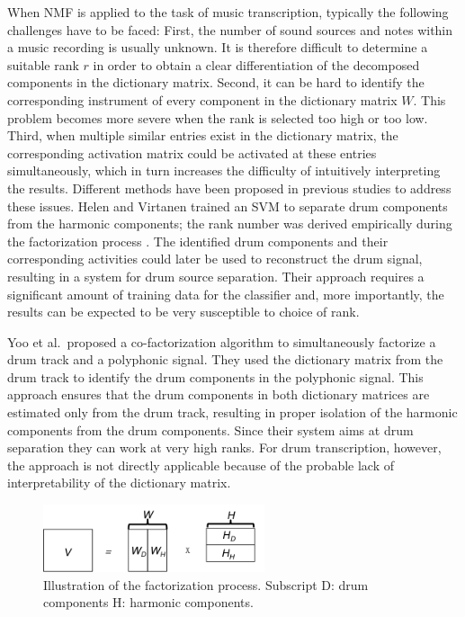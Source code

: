 \documentclass{article}
\begin{document}
When NMF is applied to the task of music transcription, typically the following challenges have to be faced:
First, the number of sound sources and notes within a music recording is usually unknown. It is therefore difficult to determine a suitable rank $r$ in order to obtain a clear differentiation of the decomposed components in the dictionary matrix. 
Second, it can be  hard to identify the corresponding instrument of every component in the dictionary matrix $W$. This problem becomes more severe when the rank is selected too high or too low. 
Third, when multiple similar entries exist in the dictionary matrix, the corresponding activation matrix could be activated at these entries simultaneously, which in turn increases the difficulty of intuitively interpreting the results. %
Different methods have been proposed in previous studies to address these issues. Helen and Virtanen trained an SVM to separate drum components from the harmonic components; the rank number was derived empirically during the factorization process \cite{helen_separation_2005}. The identified drum components and their corresponding activities could later be used to reconstruct the drum signal, resulting in a system for drum source separation. Their approach requires a significant amount of training data for the classifier and, more importantly, the results can be expected to be very susceptible to choice of rank. %

Yoo et al.\ proposed a co-factorization algorithm \cite{yoo_nonnegative_2010} to simultaneously factorize a drum track and a polyphonic signal. They used the dictionary matrix from the drum track to identify the drum components in the polyphonic signal. This approach ensures that the drum components in both dictionary matrices are estimated only from the drum track, resulting in proper isolation of the harmonic components from the drum components. Since their system aims at drum separation they can work at very high ranks. For drum transcription, however, the approach is not directly applicable because of the probable lack of interpretability of the dictionary matrix.
\begin{figure}
 \centering 
  \centerline{
 \includegraphics[width=6.5cm]{factorization_small.png}}
 \caption{Illustration of the factorization process. Subscript $\mathrm{D}$: drum components $\mathrm{H}$: harmonic components.}
 \label{fig:factorization}
\end{figure}
\end{document}
